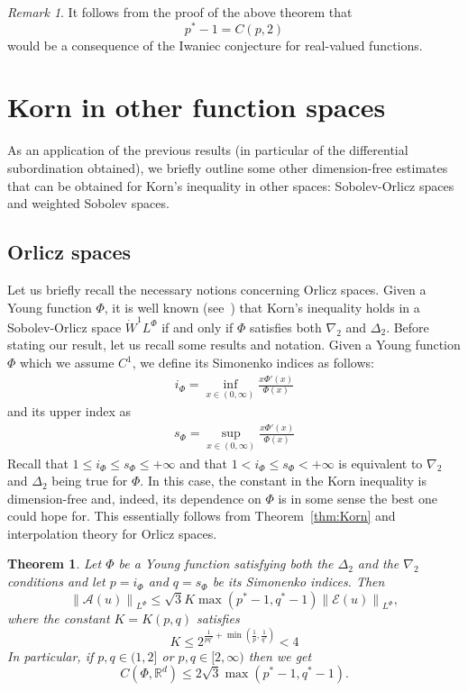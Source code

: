 \documentclass[11pt, a4paper]{amsart}
\newtheorem{theorem}{Theorem}[section]
\theoremstyle{definition}
\theoremstyle{remark}
\newtheorem{remark}{Remark}
\newcommand{\R}{\mathbb{R}}
\begin{document}
\begin{remark}\label{rmk:iwaniecreal}
It follows from the proof of the above theorem that 
\[
p^*-1=C(p,2)
\]
would be a consequence of the Iwaniec
conjecture for real-valued functions.
\end{remark}
\section{Korn in other function spaces}
As an application of the previous 
results (in particular of the
differential subordination obtained),
we briefly outline some
other dimension-free estimates that can be obtained
for Korn's inequality in other spaces:
Sobolev-Orlicz spaces and weighted Sobolev spaces.
\subsection{Orlicz spaces}
\label{sec:orlicz}
Let us briefly recall the necessary notions
concerning Orlicz spaces. Given a Young function $\Phi$,
it is well known (see~\cite{Breit2011}) that
Korn's inequality holds in a Sobolev-Orlicz
space $\dot{W}^1L^{\Phi}$
if and only if
$\Phi$ satisfies both $\nabla_2$ and $\Delta_2$.
Before stating our result, let us recall
some results and notation. 
Given a Young function $\Phi$ which we assume $C^1$,
we define its Simonenko indices as follows:
\begin{align*}
    i_\Phi=
    \inf_{x\in (0,\infty)} \frac{x\Phi'(x)}{\Phi(x)}
\end{align*}
and its upper index as
    \begin{align*}
    s_\Phi=
    \sup_{x\in (0,\infty)} \frac{x\Phi'(x)}{\Phi(x)}
\end{align*}
Recall that $1\le i_\Phi\le s_\Phi\le +\infty$
and that $1<i_\Phi\le s_\Phi<+\infty$ is equivalent to
$\nabla_2$ and $\Delta_2$ being true for $\Phi$. In this
case, the constant in the Korn inequality is 
dimension-free and, indeed, its dependence
on $\Phi$ is in some sense the best one could hope for.
This essentially follows from Theorem~\ref{thm:Korn} and
interpolation theory for Orlicz spaces.
\begin{theorem}\label{thm:Orlicz}
Let $\Phi$ be a Young function satisfying 
both the $\Delta_2$ and the $\nabla_2$
conditions and let $p=i_{\Phi}$
and $q=s_{\Phi}$ be its Simonenko indices. Then 
\begin{equation*}
    \left\|\mathcal A(u)\right\|_{L^{\Phi}}
    \le \sqrt{3}K\max(p^*-1,q^*-1)
    \left\|\mathcal E(u)\right\|_{L^{\Phi}},
\end{equation*}
where the constant $K=K(p,q)$ satisfies 
\begin{equation*}
K\le 2^{\frac{1}{pq'}
+\min\left(\frac1p,\frac1{q'}\right)}<4
\end{equation*}
In particular, if $p,q\in (1,2]$ or $p,q\in [2,\infty)$
then we get
\begin{equation*}
    C(\Phi, \R^d)\le 2\sqrt 3\max(p^*-1,q^*-1).
\end{equation*}
\end{theorem}
\end{document}
